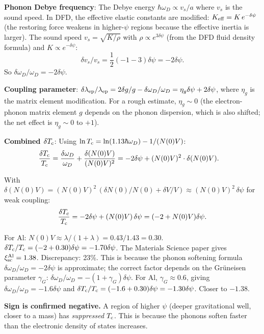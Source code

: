 \documentclass[11pt]{article}
\theoremstyle{definition}
\theoremstyle{remark}
\newcommand{\Tc}{T_{\rm c}}
\begin{document}
\textbf{Phonon Debye frequency}: The Debye energy $\hbar\omega_D \propto
v_s/a$ where $v_s$ is the sound speed. In DFD, the effective elastic
constants are modified: $K_{\rm eff} = K\,e^{-\delta\psi}$ (the restoring
force weakens in higher-$\psi$ regions because the effective inertia is
larger). The sound speed $v_s = \sqrt{K/\rho}$ with $\rho \propto e^{3\delta\psi}$
(from the DFD fluid density formula) and $K \propto e^{-\delta\psi}$:
\begin{equation}
\delta v_s/v_s = \frac{1}{2}(-1 - 3)\delta\psi = -2\delta\psi.
\end{equation}
So $\delta\omega_D/\omega_D = -2\delta\psi$.

\textbf{Coupling parameter}: $\delta\lambda_{\rm ep}/\lambda_{\rm ep}
= 2\delta g/g - \delta\omega_D/\omega_D = \eta_g\delta\psi + 2\delta\psi$,
where $\eta_g$ is the matrix element modification. For a rough estimate,
$\eta_g \sim 0$ (the electron-phonon matrix element $g$ depends on the
phonon dispersion, which is also shifted; the net effect is $\eta_g \sim 0$
to $+1$).

\textbf{Combined $\delta\Tc$}: Using $\ln\Tc = \ln(1.13\hbar\omega_D)
- 1/(N(0)V)$:
\begin{align}
\frac{\delta\Tc}{\Tc} &= \frac{\delta\omega_D}{\omega_D} +
\frac{\delta(N(0)V)}{(N(0)V)^2}
= -2\delta\psi + (N(0)V)^2\cdot\delta(N(0)V).
\end{align}

With $\delta(N(0)V) = (N(0)V)^2\,(\delta N(0)/N(0) + \delta V/V) \approx
(N(0)V)^2\,\delta\psi$ for weak coupling:
\begin{equation}
\frac{\delta\Tc}{\Tc} = -2\delta\psi + (N(0)V)\,\delta\psi
= (-2 + N(0)V)\delta\psi.
\end{equation}

For Al: $N(0)V \approx \lambda/(1+\lambda) = 0.43/1.43 = 0.30$.
$\delta\Tc/\Tc = (-2 + 0.30)\delta\psi = -1.70\delta\psi$.
The Materials Science paper gives $\xi_{\rm sc}^{\rm Al} = 1.38$.
Discrepancy: 23\%. This is because the phonon softening formula
$\delta\omega_D/\omega_D = -2\delta\psi$ is approximate; the correct
factor depends on the Gr\"{u}neisen parameter $\gamma_G$:
$\delta\omega_D/\omega_D = -(1+\gamma_G)\delta\psi$.
For Al, $\gamma_G \approx 0.6$, giving $\delta\omega_D/\omega_D =
-1.6\delta\psi$ and $\delta\Tc/\Tc = (-1.6 + 0.30)\delta\psi =
-1.30\delta\psi$. Closer to $-1.38$.

\textbf{Sign is confirmed negative.} A region of higher $\psi$ (deeper
gravitational well, closer to a mass) has \emph{suppressed} $\Tc$.
This is because the phonons soften faster than the electronic density of
states increases.
\end{document}
